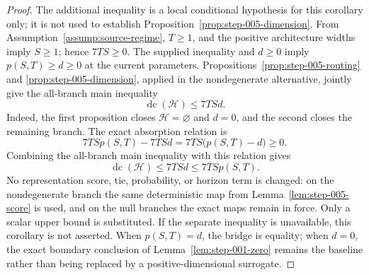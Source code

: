 \begin{proof}
The additional inequality is a local conditional hypothesis for this
corollary only; it is not used to establish
Proposition~\ref{prop:step-005-dimension}.  From
Assumption~\ref{assump:source-regime}, $T\geq1$, and the positive
architecture widths imply $S\geq1$; hence $7TS\geq0$.  The supplied
inequality and $d\geq0$ imply $p(S,T)\geq d\geq0$ at the current parameters.
Propositions~\ref{prop:step-005-routing} and
\ref{prop:step-005-dimension}, applied in the nondegenerate alternative,
jointly give the all-branch main inequality
\[
\operatorname{dc}(\mathcal H)\leq7TSd.
\]
Indeed, the first proposition closes $\mathcal H=\varnothing$ and $d=0$,
and the second closes the remaining branch.  The exact absorption relation is
\[
7TSp(S,T)-7TSd=7TS\bigl(p(S,T)-d\bigr)\geq0.
\]
Combining the all-branch main inequality with this relation gives
\[
\operatorname{dc}(\mathcal H)\leq7TSd\leq7TSp(S,T).
\]
No representation score, tie, probability, or horizon term is changed: on the
nondegenerate branch the same deterministic map from
Lemma~\ref{lem:step-005-score} is used, and on the null branches the exact maps
remain in force.  Only a scalar upper bound is substituted.  If the separate
inequality is unavailable, this corollary is not asserted.  When
$p(S,T)=d$, the bridge is equality; when $d=0$, the exact boundary conclusion
of Lemma~\ref{lem:step-001-zero} remains the baseline rather than being
replaced by a positive-dimensional surrogate.
\end{proof}

